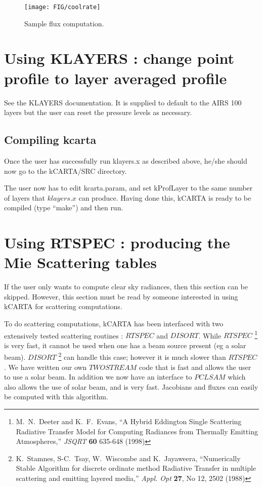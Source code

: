 \documentclass[12pt]{article}
\newcommand{\kc}{\textsf{kCARTA}\xspace}
\begin{document}
\begin{figure}
\texttt{[image: FIG/coolrate]}
\caption{Sample flux computation.}
\label{sampleflux}
\end{figure}

\section{Using KLAYERS : change point profile to layer averaged profile}
See the KLAYERS documentation. It is supplied to default to the AIRS 100 layers
but the user can reset the pressure levels as necessary.

\subsection{Compiling kcarta}
Once the user has successfully run klayers.x as described above, he/she should
now go to the kCARTA/SRC directory. 

The user now has to edit kcarta.param, and set kProfLayer to the same number 
of layers that $klayers.x$ can produce. Having 
done this, \kc is ready to be compiled (type ``make'') and then run.

\section{Using RTSPEC : producing the Mie Scattering tables}
If the user only wants to compute clear sky radiances, then this section can 
be skipped. However, this section must be read by someone interested in using
\kc for scattering computations. 

To do scattering computations, \kc has been interfaced with two extensively
tested scattering routines : $RTSPEC$ and $DISORT$. While $RTSPEC$ 
\footnote{ M.~N.~Deeter and K.~F.~Evans, ``A Hybrid Eddington Single 
Scattering Radiative Transfer Model for Computing Radiances from Thermally 
Emitting Atmospheres,'' {\em JSQRT} {\bf 60} 635-648 (1998)}
is very fast, it cannot be used when one has a beam source present 
(eg a solar beam). $DISORT$ 
\footnote{ K.~Stamnes, S-C.~Tsay, W.~Wiscombe and K.~Jayaweera, ``Numerically
Stable Algorithm for discrete ordinate method Radiative Transfer in multiple
scattering and emitting layered media,'' {\em Appl. Opt} {\bf 27}, No 12, 2502
(1988)} can handle this case; however it is much slower than $RTSPEC$. We have
written our own $TWOSTREAM$ code that is fast and allows the user to use a
solar beam. In addition we now have an interface to $PCLSAM$ which also 
allows the use of solar beam, and is very fast. Jacobians and fluxes can easily
be computed with this algorithm.
\end{document}
